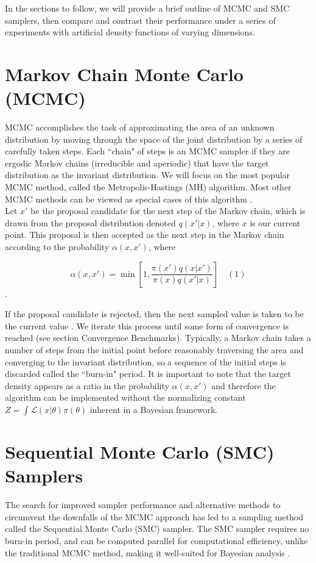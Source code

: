 \documentclass[12pt]{elsarticle}
\begin{document}
In the sections to follow, we will provide a brief outline of MCMC and SMC samplers, then compare and contrast their performance under a series of experiments with artificial density functions of varying dimensions.

\section*{Markov Chain Monte Carlo (MCMC)}
MCMC accomplishes the task of approximating the area of an unknown distribution by moving through the space of the joint distribution by a series of carefully taken steps. Each ``chain" of steps is an MCMC sampler if they are ergodic Markov chains (irreducible and aperiodic) that have the target distribution as the invariant distribution.  We will focus on the most popular MCMC method, called the Metropolis-Hastings (MH) algorithm. Most other MCMC methods can be viewed as special cases of this algorithm \cite{Andrieu2003}. \\

Let $x'$ be the proposal candidate for the next step of the Markov chain, which is drawn from the proposal distribution denoted $q(x'|x)$, where $x$ is our current point. This proposal is then accepted as the next step in the Markov chain according to the probability $\alpha(x,x')$, where 

\[
\alpha(x,x') = \min{\left[1, \frac{\pi(x') q(x|x')}{\pi(x)q(x'|x)}\right]} \quad (1)
\].

If the proposal candidate is rejected, then the next sampled value is taken to be the current value \cite{Andrieu2003}. We iterate this process until some form of convergence is reached (see section Convergence Benchmarks). Typically, a Markov chain takes a number of steps from the initial point before reasonably traversing the area and converging to the invariant distribution, so a sequence of the initial steps is discarded called the ``burn-in" period. It is important to note that the target density appears as a ratio in the probability $ \alpha(x,x')$ and therefore the algorithm can be implemented without the normalizing constant $Z = \int \mathcal{L}(x|\theta)\pi(\theta)$ inherent in a Bayesian framework.

\section*{Sequential Monte Carlo (SMC) Samplers}

The search for improved sampler performance and alternative methods to circumvent the downfalls of the MCMC approach has led to a sampling method called the Sequential Monte Carlo (SMC) sampler. The SMC sampler requires no burn-in period, and can be computed parallel for computational efficiency, unlike the traditional MCMC method, making it well-suited for Bayesian analysis \cite{Bishop2007}. \\
\end{document}
